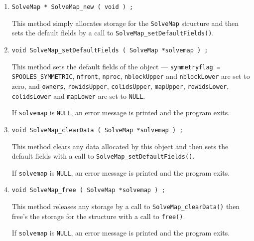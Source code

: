 \begin{enumerate}
\item
\begin{verbatim}
SolveMap * SolveMap_new ( void ) ;
\end{verbatim}
This method simply allocates storage for the {\tt SolveMap} structure 
and then sets the default fields by a call to 
{\tt SolveMap\_setDefaultFields()}.
\item
\begin{verbatim}
void SolveMap_setDefaultFields ( SolveMap *solvemap ) ;
\end{verbatim}
This method sets the default fields of the object ---
{\tt symmetryflag = SPOOLES\_SYMMETRIC},
{\tt nfront}, {\tt nproc}, {\tt nblockUpper} 
and {\tt nblockLower} are set to zero,
and {\tt owners}, {\tt rowidsUpper}, {\tt colidsUpper}, {\tt mapUpper}, 
{\tt rowidsLower}, {\tt colidsLower} and {\tt mapLower} are 
set to {\tt NULL}.
\par {}
If {\tt solvemap} is {\tt NULL},
an error message is printed and the program exits.
\item
\begin{verbatim}
void SolveMap_clearData ( SolveMap *solvemap ) ;
\end{verbatim}
This method clears any data allocated by this object and then sets
the default fields 
with a call to {\tt SolveMap\_setDefaultFields()}.
\par {}
If {\tt solvemap} is {\tt NULL},
an error message is printed and the program exits.
\item
\begin{verbatim}
void SolveMap_free ( SolveMap *solvemap ) ;
\end{verbatim}
This method releases any storage by a call to 
{\tt SolveMap\_clearData()} then free's the storage for the 
structure with a call to {\tt free()}.
\par {}
If {\tt solvemap} is {\tt NULL},
an error message is printed and the program exits.
\end{enumerate}
\par
\par
